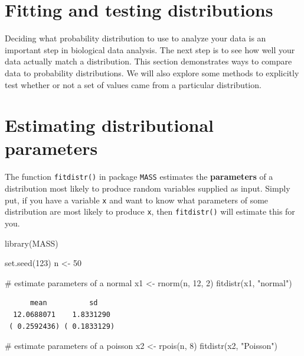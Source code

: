\documentclass[
  13,
  letterpaper,
]{report}
\newenvironment{Shaded}{\begin{snugshade}}{\end{snugshade}}
\newcommand{\CommentTok}[1]{\textcolor[rgb]{0.37,0.37,0.37}{#1}}
\newcommand{\DecValTok}[1]{\textcolor[rgb]{0.68,0.00,0.00}{#1}}
\newcommand{\FunctionTok}[1]{\textcolor[rgb]{0.28,0.35,0.67}{#1}}
\newcommand{\NormalTok}[1]{\textcolor[rgb]{0.00,0.23,0.31}{#1}}
\newcommand{\OtherTok}[1]{\textcolor[rgb]{0.00,0.23,0.31}{#1}}
\newcommand{\StringTok}[1]{\textcolor[rgb]{0.13,0.47,0.30}{#1}}
\begin{document}
\section{Fitting and testing distributions}\label{sec-dtest-fit}

Deciding what probability distribution to use to analyze your data is an
important step in biological data analysis. The next step is to see how
well your data actually match a distribution. This section demonstrates
ways to compare data to probability distributions. We will also explore
some methods to explicitly test whether or not a set of values came from
a particular distribution.

\section{Estimating distributional
parameters}\label{sec-dtest-fit-param}

The function \texttt{fitdistr()} in package \texttt{MASS} estimates the
\textbf{parameters} of a distribution most likely to produce random
variables supplied as input. Simply put, if you have a variable
\texttt{x} and want to know what parameters of some distribution are
most likely to produce \texttt{x}, then \texttt{fitdistr()} will
estimate this for you.

\begin{Shaded}
\begin{Highlighting}[]
\FunctionTok{library}\NormalTok{(MASS)}

\FunctionTok{set.seed}\NormalTok{(}\DecValTok{123}\NormalTok{)}
\NormalTok{n }\OtherTok{\textless{}{-}} \DecValTok{50}

\CommentTok{\# estimate parameters of a normal}
\NormalTok{x1 }\OtherTok{\textless{}{-}} \FunctionTok{rnorm}\NormalTok{(n, }\DecValTok{12}\NormalTok{, }\DecValTok{2}\NormalTok{)}
\FunctionTok{fitdistr}\NormalTok{(x1, }\StringTok{"normal"}\NormalTok{)}
\end{Highlighting}
\end{Shaded}

\begin{verbatim}
      mean          sd    
  12.0688071    1.8331290 
 ( 0.2592436) ( 0.1833129)
\end{verbatim}

\begin{Shaded}
\begin{Highlighting}[]
\CommentTok{\# estimate parameters of a poisson}
\NormalTok{x2 }\OtherTok{\textless{}{-}} \FunctionTok{rpois}\NormalTok{(n, }\DecValTok{8}\NormalTok{)}
\FunctionTok{fitdistr}\NormalTok{(x2, }\StringTok{"Poisson"}\NormalTok{)}
\end{Highlighting}
\end{Shaded}
\end{document}
